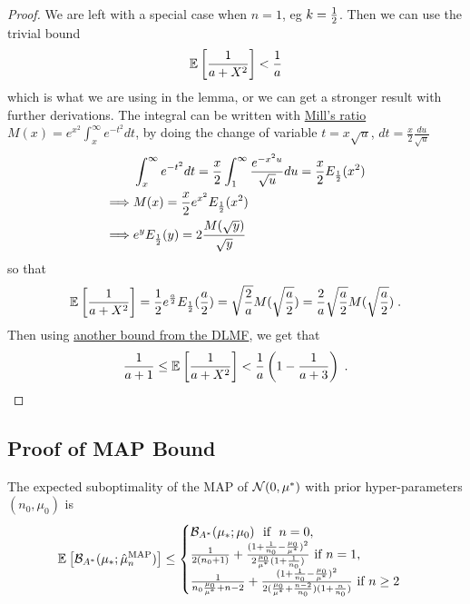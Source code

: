 \documentclass{article}
\newcommand*{\expect}[2][]{\ensuremath{\mathbb{E}_{#1} \left[ #2 \right] }} %
\newcommand{\logpart}{A}
\newcommand{\bregmanconj}{\cB_{\logpart^*}}
\begin{document}
\begin{proof}
We are left with a special case when  $n=1$, eg $k=\frac{1}{2}$. 
Then we can use the trivial bound 
\begin{align}
	\expect{\inv{a + X^2}} < \inv{a}
	\label{eq:trivial_bound}
\end{align}
which is what we are using in the lemma,
or we can get a stronger result with further derivations.
The integral can be written with \href{https://dlmf.nist.gov/7.8.E1}{Mill's ratio} $M(x) = e^{x^2} \int_x^\infty e^{-t^2} dt$, by doing the change of variable $t= x \sqrt{u}$, $dt=\frac{x}{2} \frac{du}{\sqrt{u}}$ 
\begin{align}
	& \int_x^\infty e^{-t^2} dt 
	= \frac{x}{2} \int_1^\infty \frac{e^{-x^2 u}}{\sqrt{u}} du 
	= \frac{x}{2} E_{\frac{1}{2}}(x^2) \\
	\implies & M(x) = \frac{x}{2} e^{x^2} E_{\frac{1}{2}}(x^2) \\
	\implies & e^{y} E_{\frac{1}{2}}(y) = 2 \frac{M(\sqrt{y})}{\sqrt{y} }
\end{align}
so that 
\begin{align}
		\expect{\inv{a + X^2}} 
		= \half e^{\half[a]} E_{\half[1]}(\half[a]) 
		= \sqrt{\frac{2}{a}} M(\sqrt{\half[a]})
		= \frac{2}{a} \sqrt{\half[a]} M(\sqrt{\half[a]}) \; .
\end{align}
Then using \href{https://dlmf.nist.gov/7.8.E8}{another bound from the DLMF}, we get that 
\begin{align}
	\inv{a+1}
	\leq \expect{\inv{a + X^2}} 
	< \inv{a}\left( 1 - \inv{a+3} \right) \; .
\end{align}
\end{proof}


\subsection{Proof of MAP Bound}
\begin{theorem}
 The expected suboptimality of the MAP of ${\mathcal N}(0,\mu^*)$ with prior hyper-parameters $(n_0,\mu_0)$ is 
\begin{equation}
	\expect{\bregmanconj( \mu_*; \hat \mu_n^\text{MAP})}
	\leq \begin{cases}
		\bregmanconj( \mu_*; \mu_0) \ \text{ if } \ n=0, \\
		\inv{2(n_0+1)}  + \frac{(1 + \inv{n_0} - \frac{\mu_0}{\mu^*})^2}{2 \frac{\mu_0}{\mu^*}(1 + \inv{n_0} )} \ \text{if}\ n=1,\\
		\frac{1}{n_0 \frac{\mu_0}{\mu^*} +n-2} + \frac{(1 + \inv{n_0} - \frac{\mu_0}{\mu^*})^2}{2 (\frac{\mu_0}{\mu^*}+\frac{n-2}{n_0})(1 + \frac{n}{n_0} )} \ \text{if}\ n\geq 2
	\end{cases}
\end{equation}
\end{theorem} 
\end{document}

